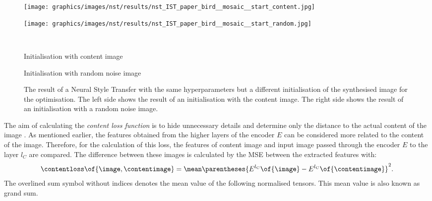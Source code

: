 \begin{figure}[h]
	\centering
	\begin{minipage}{.5\textwidth}
		\centering
		\texttt{[image: graphics/images/nst/results/nst\_IST\_paper\_bird\_\_mosaic\_\_start\_content.jpg]}
	\end{minipage}%
	\begin{minipage}{.5\textwidth}
		\centering
		\texttt{[image: graphics/images/nst/results/nst\_IST\_paper\_bird\_\_mosaic\_\_start\_random.jpg]}
	\end{minipage}\\ \vspace{0.15cm}
	\begin{minipage}{.5\textwidth}
		\centering
		Initialisation with content image
	\end{minipage}%
	\begin{minipage}{.5\textwidth}
		\centering
		Initialisation with random noise image
	\end{minipage}
	\caption{The result of a Neural Style Transfer with the same hyperparameters but a different initialisation of the synthesised image for the optimisation. The left side shows the result of an initialisation with the content image. The right side shows the result of an initialisation with a random noise image.}
	\label{fig:diff_init_nst}
\end{figure}

The aim of calculating the \emph{content loss function} \contentloss{} is to hide unnecessary details and determine only the distance to the actual content of the image \cite{Glas2021}. As mentioned earlier, the features obtained from the higher layers of the encoder $E$ can be considered more related to the content of the image. Therefore, for the calculation of this loss, the features of content image and input image passed through the encoder $E$ to the layer $l_C$ are compared. The difference between these images is calculated by the \gls{MSE} between the extracted features with:
\begin{equation*}
	\contentloss\of{\image\eqcommasep \contentimage} = \mean \parentheses{E^{l_\text{C}}\of{\image} - E^{l_\text{C}}\of{\contentimage}}^2 \eqtextdot
\end{equation*}
The overlined sum symbol without indices denotes the mean value of the following normalised tensors. This mean value is also known as grand sum.

